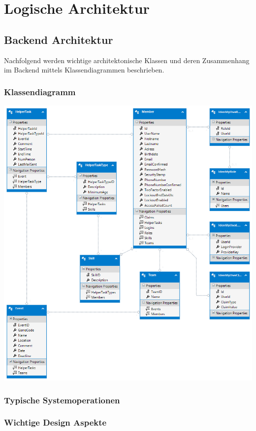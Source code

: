 \chapter{Logische Architektur}


\section{Backend Architektur}
	Nachfolgend werden wichtige architektonische Klassen und deren Zusammenhang im Backend mittels Klassendiagrammen beschrieben.

	\subsection{Klassendiagramm}
	\includegraphics[width=\textwidth]{content/architekturdokumentation/images/edmx.png}
	
	\subsection{Typische Systemoperationen}

	\subsection{Wichtige Design Aspekte}
